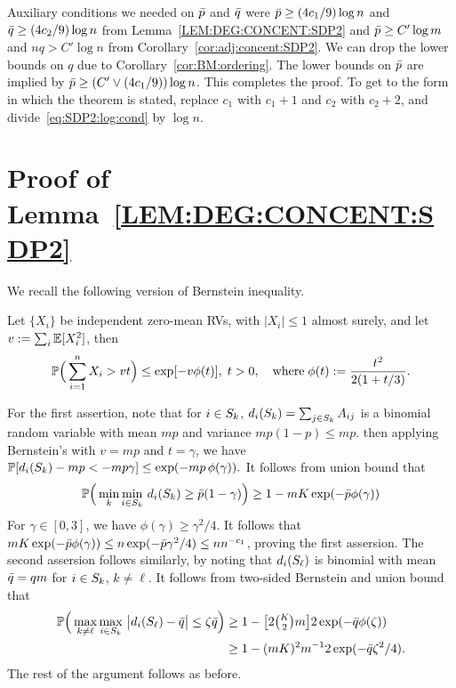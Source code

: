 Auxiliary conditions we needed on $\bar{p}$ and $\bar{q}$ were $\bar{p} \ge (4c_1/9) \log n$ and $\bar{q} \ge (4c_2/9) \log n$ from Lemma~\ref{LEM:DEG:CONCENT:SDP2} and $\bar{p} \ge C' \log m$ and $n q > C' \log n$ from Corollary~\ref{cor:adj:concent:SDP2}. We can drop the lower bounds on $q$ due to Corollary~\ref{cor:BM:ordering}. The lower bounds on $\bar{p}$ are implied by $\bar{p} \ge (C' \vee (4c_1/9)) \log n$. This completes the proof. To get to the form in which the theorem is stated, replace $c_1$ with $c_1 + 1$ and $c_2$ with $c_2 + 2$, and divide~\eqref{eq:SDP2:log:cond} by $\log n$.

















\section{Proof of Lemma~\ref{LEM:DEG:CONCENT:SDP2}}\label{sec:proof:deg:concent:SDP2}
We recall the following version of Bernstein inequality.
\begin{prop}[Bernstein]
  Let $\{X_i\}$ be independent zero-mean RVs, with $|X_i| \le 1$ almost surely, and let $v := \sum_i \mathbb{E}[X_i^2]$, then
  \begin{align*}
    \mathbb{P} \Big( \sum_{i=1}^n X_i > v t\Big) \le \exp [-v \phi(t)], \; t >0, 
      \quad \text{where} \; \phi(t):= \frac{t^2}{2(1 + t/3)}.
  \end{align*}
\end{prop}
   For the first assertion, note that for $i \in S_{k}$, $d_{i}(S_{k}) = \sum_{j \in S_{k}} A_{ij}$ is a binomial random variable with mean $mp$ and variance $mp(1-p) \le mp$. then applying Bernstein's with $v = mp$ and $t = \gamma$, we have
  $
    \mathbb{P} [d_{i}(S_{k}) - mp < - mp\gamma ] \le \exp( -mp \, \phi(\gamma)).
  $
  It follows from union bound that 
  \begin{align*}
    \mathbb{P} \Big(\min_{k} \min_{i \in S_{k}}\, d_{i}(S_{k}) \ge \bar{p} (1-\gamma) \Big) \ge 1- m K \exp(-\bar{p} \phi(\gamma))
  \end{align*}
  For $\gamma \in [0,3]$, we have $\phi(\gamma) \ge \gamma^2/4$. It follows that
  $mK \exp(-\bar{p} \phi(\gamma)) \le n \exp(-\bar{p} \gamma^2/4) \le n n^{-c_1}$, proving the first assersion. The second assersion follows similarly, by noting that $d_{i}(S_{\ell})$ is binomial with mean $\bar{q} = qm$ for $i \in S_{k}$, $k \neq \ell$. It follows from two-sided Bernstein and union bound that
  \begin{align*}
    \mathbb{P} \Big(\max_{k\neq\ell} \max_{i \in S_{k}}\, \big| d_{i}(S_{\ell}) - \bar{q} \big| \le \zeta \bar{q} \Big) 
    &\ge 1-  \big[2\tbinom{K}{2} m\big] 2 \exp(-\bar{q} \phi(\zeta)) \\
    &\ge 1 - (m K)^2 m^{-1} 2 \exp(-\bar{q} \zeta^2/4).
  \end{align*}
  The rest of the argument follows as before.



